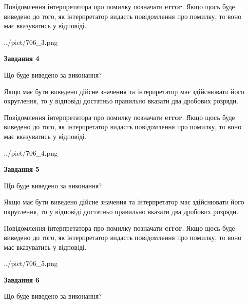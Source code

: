 \documentclass[12pt, ukrainian]{article}
\begin{document}
{\begin {Large}
Повідомлення інтерпретатора про помилку позначати \textbf{error}.
Якщо щось буде виведено до того, як інтерпретатор видасть повідомлення про помилку, 
то воно має вказуватись у відповіді. \par

\begin{center}
	{../pict/706_3.png}
\end{center}
\newpage

{\begin {center}\textbf{Завдання 4}\end {center}}\par
Що буде виведено за виконання? \par

Якщо має бути виведено дійсне значення та інтерпретатор має здійснювати його округлення, 
то у відповіді достатньо правильно вказати два дробових розряди.

Повідомлення інтерпретатора про помилку позначати \textbf{error}.
Якщо щось буде виведено до того, як інтерпретатор видасть повідомлення про помилку, 
то воно має вказуватись у відповіді. \par

\begin{center}
	{../pict/706_4.png}
\end{center}
\newpage

{\begin {center}\textbf{Завдання 5}\end {center}}\par
Що буде виведено за виконання? \par

Якщо має бути виведено дійсне значення та інтерпретатор має здійснювати його округлення, 
то у відповіді достатньо правильно вказати два дробових розряди.

Повідомлення інтерпретатора про помилку позначати \textbf{error}.
Якщо щось буде виведено до того, як інтерпретатор видасть повідомлення про помилку, 
то воно має вказуватись у відповіді. \par

\begin{center}
	{../pict/706_5.png}
\end{center}
\newpage

{\begin {center}\textbf{Завдання 6}\end {center}}\par
Що буде виведено за виконання? \par


\end{Large}}
\end{document}
